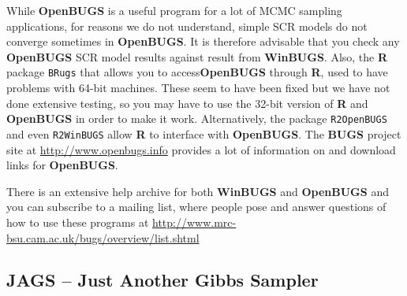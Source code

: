 While {\bf OpenBUGS} is a useful program for a lot of MCMC sampling
applications, for reasons we do not understand, simple SCR models do
not converge sometimes in {\bf OpenBUGS}. It is therefore advisable that 
you check any
{\bf OpenBUGS} SCR model results against result from {\bf WinBUGS}. Also,
 the {\bf R} package \mbox{\tt BRugs} \citep{thomas_etal:2006} that allows you to access{\bf OpenBUGS} through {\bf R}, used to have problems with 64-bit 
machines. These seem to have been fixed but we have not done extensive testing, so
you may have to use the 32-bit version of {\bf R} and {\bf OpenBUGS} 
in order to
make it work. Alternatively, the package \mbox{\tt R2OpenBUGS} \citep{sturtz_etal:2005} and even \mbox{\tt R2WinBUGS} allow {\bf R} to interface with {\bf OpenBUGS}. The {\bf BUGS} project site at 
\url{http://www.openbugs.info}
provides a lot of information on and download links for {\bf OpenBUGS}.

There is an extensive help archive for both {\bf WinBUGS} and {\bf OpenBUGS}
 and you can subscribe to a mailing list, where people pose and answer 
 questions of how to use these programs at 
 \url{http://www.mrc-bsu.cam.ac.uk/bugs/overview/list.shtml}

\subsection{JAGS -- Just Another Gibbs Sampler}

